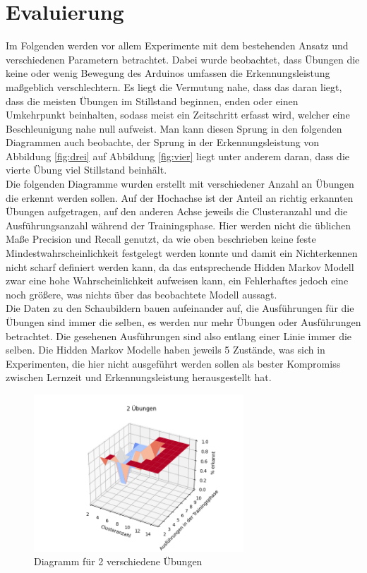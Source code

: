 \documentclass{article}
\begin{document}
\newpage
\section{Evaluierung}
\label{sec:evaluation}
Im Folgenden werden vor allem Experimente mit dem bestehenden Ansatz und verschiedenen Parametern betrachtet.
Dabei wurde beobachtet, dass Übungen die keine oder wenig Bewegung des Arduinos umfassen die Erkennungsleistung maßgeblich verschlechtern.
Es liegt die Vermutung nahe, dass das daran liegt, dass die meisten Übungen im Stillstand beginnen, enden oder einen \glqq Umkehrpunkt\grqq{} beinhalten, sodass meist ein Zeitschritt erfasst wird, welcher eine Beschleunigung nahe null aufweist.
Man kann diesen Sprung in den folgenden Diagrammen auch beobachte, der Sprung in der Erkennungsleistung von Abbildung \ref{fig:drei} auf Abbildung \ref{fig:vier} liegt unter anderem daran, dass die vierte Übung viel Stillstand beinhält.\\
Die folgenden Diagramme wurden erstellt mit verschiedener Anzahl an Übungen die erkennt werden sollen.
Auf der Hochachse ist der Anteil an richtig erkannten Übungen aufgetragen, auf den anderen Achse jeweils die Clusteranzahl und die Ausführungsanzahl während der Trainingsphase.
Hier werden nicht die üblichen Maße Precision und Recall genutzt, da wie oben beschrieben keine feste Mindestwahrscheinlichkeit festgelegt werden konnte und damit ein Nichterkennen nicht scharf definiert werden kann, da das entsprechende Hidden Markov Modell zwar eine hohe Wahrscheinlichkeit aufweisen kann, ein Fehlerhaftes jedoch eine noch größere, was nichts über das beobachtete Modell aussagt.\\
Die Daten zu den Schaubildern bauen aufeinander auf, die Ausführungen für die Übungen sind immer die selben, es werden nur mehr Übungen oder Ausführungen betrachtet.
Die gesehenen Ausführungen sind also entlang einer Linie immer die selben.
Die Hidden Markov Modelle haben jeweils 5 Zustände, was sich in Experimenten, die hier nicht ausgeführt werden sollen als bester Kompromiss zwischen Lernzeit und Erkennungsleistung herausgestellt hat.
\medskip
\begin{figure}[h]
\centering
\includegraphics[width=0.7\textwidth]{figures/2_graph.png}
\caption{Diagramm für 2 verschiedene Übungen}
\label{fig:zwei}
\end{figure}\\
\end{document}

